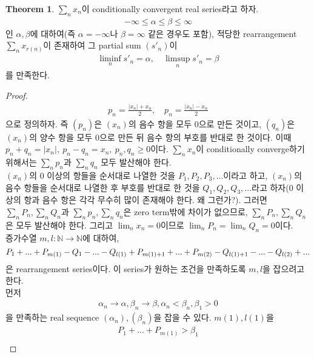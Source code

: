 \documentclass[12pt]{article}
\theoremstyle{definition}
\newtheorem{thm}{Theorem}[section]
\def\NN{\mathbb{N}}
\newcommand{\abs}[1]{\left\vert#1\right\vert}
\begin{document}
	\begin{thm}
		\(\sum_n x_n\)이 conditionally convergent real series라고 하자.
		\begin{align*}
			-\infty \le \alpha \le \beta \le \infty
		\end{align*}
		인 \(\alpha, \beta\)에 대하여(즉 \(\alpha = -\infty\)나 \(\beta = \infty\) 같은 경우도 포함), 적당한 rearrangement \(\sum_n x_{r(n)}\)이 존재하여 그 partial sum \((s'_n)\)이
		\begin{align*}
			\liminf_n s'_n = \alpha, \quad \limsup_n s'_n = \beta
		\end{align*}
		를 만족한다.
	\end{thm}
	\begin{proof}
		\begin{align*}
			p_n = \frac{\abs{x_n} + x_n}{2}, \quad p_n = \frac{\abs{x_n} - x_n}{2}
		\end{align*}
		으로 정의하자. 즉 \((p_n)\)은 \((x_n)\)의 음수 항을 모두 0으로 만든 것이고, \((q_n)\)은 \((x_n)\)의 양수 항을 모두 0으로 만든 뒤 음수 항의 부호를 반대로 한 것이다. 이때 \(p_n + q_n = \abs{x_n},\: p_n - q_n = x_n, \: p_n, q_n \ge 0\)이다. \(\sum_n x_n\)이 conditionally converge하기 위해서는 \(\sum_n p_n\)과 \(\sum_n q_n\) 모두 발산해야 한다.\\
		\((x_n)\)의 0 이상의 항들을 순서대로 나열한 것을 \(P_1, P_2, P_3, ...\)이라고 하고, \((x_n)\)의 음수 항들을 순서대로 나열한 후 부호를 반대로 한 것을 \(Q_1, Q_2, Q_3, ...\)라고 하자(0 이상의 항과 음수 항은 각각 무수히 많이 존재해야 한다. 왜 그런가?). 그러면 \(\sum_n P_n, \sum_n Q_n\)과 \(\sum_n p_n, \sum_n q_n\)은 zero term밖에 차이가 없으므로, \(\sum_n P_n, \sum_n Q_n\)은 모두 발산해야 한다. 그리고 \(\lim_n x_n = 0\)이므로 \(\lim_n P_n = \lim_n Q_n = 0\)이다.\\
		증가수열 \(m, l: \NN \rightarrow \NN\)에 대하여,
		\begin{equation}
			P_1 + ... + P_{m(1)} - Q_1 - ... - Q_{l(1)} + P_{m(1)+1} + ... + P_{m(2)} - Q_{l(1)+1} - ... - Q_{l(2)} + ... \notag
		\end{equation}
		은 rearrangement series이다. 이 series가 원하는 조건을 만족하도록 \(m, l\)을 잡으려고 한다.\\
		먼저
		\begin{align*}
			\alpha_n \rightarrow \alpha, \beta_n \rightarrow \beta, \alpha_n < \beta_n, \beta_1 > 0
		\end{align*}
		을 만족하는 real sequence \((\alpha_n), (\beta_n)\)을 잡을 수 있다. \(m(1), l(1)\)을
		\begin{gather*}
			P_1 + ... + P_{m(1)} > \beta_1\\

\end{gather*}
\end{proof}
\end{document}
